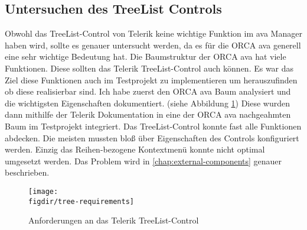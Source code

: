 \subsection{Untersuchen des TreeList Controls}
Obwohl das TreeList-Control von Telerik keine wichtige Funktion im \ac{ava} Manager haben wird, sollte es genauer untersucht werden, da es für die ORCA \ac{ava} generell eine sehr wichtige Bedeutung hat. Die Baumstruktur der ORCA \ac{ava} hat viele Funktionen. Diese sollten das Telerik TreeList-Control auch können. Es war das Ziel diese Funktionen auch im Testprojekt zu implementieren um herauszufinden ob diese realisierbar sind.
Ich habe zuerst den ORCA \ac{ava} Baum analysiert und die wichtigsten Eigenschaften dokumentiert. (siehe Abbildung \ref{fig:tree-requirements}) Diese wurden dann mithilfe der Telerik Dokumentation in eine der ORCA \ac{ava} nachgeahmten Baum im Testprojekt integriert. Das TreeList-Control konnte fast alle Funktionen abdecken. Die meisten mussten bloß über Eigenschaften des Controls konfiguriert werden. Einzig das Reihen-bezogene Kontextmenü konnte nicht optimal umgesetzt werden. Das Problem wird in \autoref{chap:external-components} genauer beschrieben.

\begin{figure}[h]
	\centering
	{\caption{Anforderungen an das Telerik TreeList-Control }
		\label{fig:tree-requirements}}
	{\texttt{[image: \\figdir/tree-requirements]}}
\end{figure}

